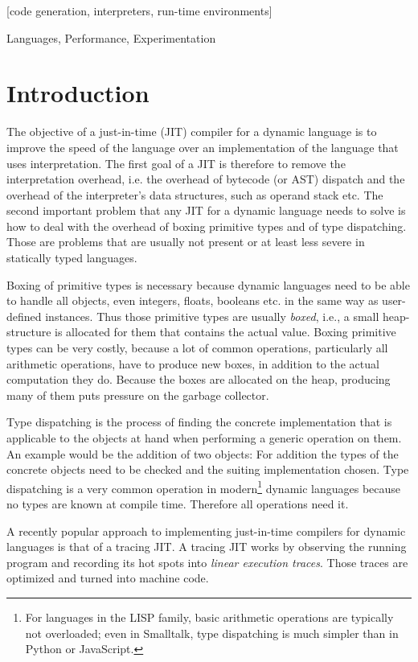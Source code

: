 \documentclass[preprint]{sigplanconf}
\newcommand\ie{i.e.,\xspace}
\begin{document}
[code generation,
interpreters, run-time environments]

\terms
Languages, Performance, Experimentation


\section{Introduction}

The objective of a just-in-time (JIT) compiler for a dynamic language is to
improve the speed of the language over an implementation of the language that
uses interpretation. The first goal of a JIT is therefore to remove the
interpretation overhead, i.e. the overhead of bytecode (or AST) dispatch and the
overhead of the interpreter's data structures, such as operand stack etc. The
second important problem that any JIT for a dynamic language needs to solve is
how to deal with the overhead of boxing primitive types and of type
dispatching. Those are problems that are usually not present or at least less
severe in statically typed languages.

Boxing of primitive types is necessary because dynamic languages need to be able to handle
all objects, even integers, floats, booleans etc. in the same way as user-defined
instances. Thus those primitive types are usually \emph{boxed}, \ie a small
heap-structure is allocated for them that contains the actual value. Boxing
primitive types can be very costly, because a lot of common operations,
particularly all arithmetic operations, have to produce new boxes, in addition
to the actual computation they do. Because the boxes are allocated on the heap,
producing many of them puts pressure on the garbage collector.

Type dispatching is the process of finding the concrete implementation that is
applicable to the objects at hand when performing a generic operation on them. An
example would be the addition of two objects: For addition the types of the
concrete objects need to be checked and the suiting implementation chosen.
Type dispatching is a very common operation in
modern\footnote{For languages in the LISP family, basic arithmetic operations
are typically not overloaded; even in Smalltalk, type dispatching is much
simpler than in Python or JavaScript.}
dynamic languages because no types are known at compile time. Therefore all
operations need it.

A recently popular approach to implementing just-in-time compilers for dynamic
languages is that of a tracing JIT. A tracing JIT works by observing the running
program and recording its hot spots into \emph{linear execution traces}. Those
traces are optimized and turned into machine code.
\end{document}
